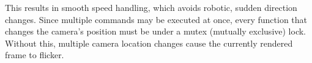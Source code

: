 This results in smooth speed handling, which avoids robotic, sudden direction changes. Since multiple commands may be executed at once, every function that changes the camera's position must be under a mutex (mutually exclusive) lock. Without this, multiple camera location changes cause the currently rendered frame to flicker.

